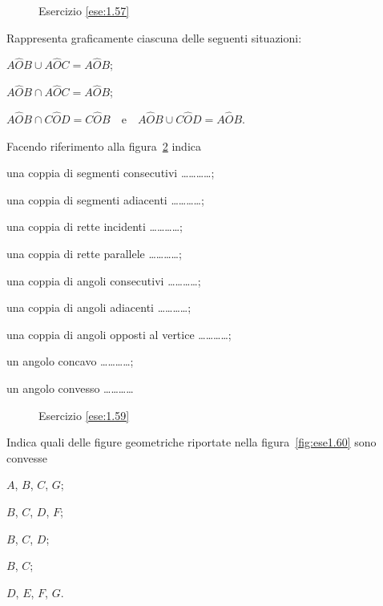 \begin{figure}[htb]
 \centering
 \caption{Esercizio \ref{ese:1.57}}\label{fig:ese1.57}
\end{figure}

\begin{esercizio}
\label{ese:1.58}
Rappresenta graficamente ciascuna delle seguenti situazioni:
\begin{enumeratea}
\item $A\widehat{O}B\cup A\widehat{O}C=A\widehat{O}B$;
\item $A\widehat{O}B\cap A\widehat{O}C=A\widehat{O}B$;
\item $A\widehat{O}B\cap C\widehat{O}D=C\widehat{O}B$~~e~~$A\widehat{O}B\cup C\widehat{O}D=A\widehat{O}B$.
\end{enumeratea}
\end{esercizio}

\begin{esercizio}
\label{ese:1.59}
Facendo riferimento alla figura~\ref{fig:ese1.59} indica
\begin{enumeratea}
\item una coppia di segmenti consecutivi \ldots\ldots\ldots\ldots{};
\item una coppia di segmenti adiacenti \ldots\ldots\ldots\ldots{};
\item una coppia di rette incidenti \ldots\ldots\ldots\ldots{};
\item una coppia di rette parallele \ldots\ldots\ldots\ldots{};
\item una coppia di angoli consecutivi \ldots\ldots\ldots\ldots{};
\item una coppia di angoli adiacenti \ldots\ldots\ldots\ldots{};
\item una coppia di angoli opposti al vertice \ldots\ldots\ldots\ldots{};
\item un angolo concavo \ldots\ldots\ldots\ldots{};
\item un angolo convesso \ldots\ldots\ldots\ldots{}
\end{enumeratea}
\end{esercizio}

\begin{figure}[htb]
 \centering
 \caption{Esercizio \ref{ese:1.59}}\label{fig:ese1.59}
\end{figure}

\begin{esercizio}
\label{ese:1.60}
Indica quali delle figure geometriche riportate nella figura~\ref{fig:ese1.60} sono convesse
\begin{multicols}{5}
\begin{enumeratea}
\item $A$, $B$, $C$, $G$;
\item $B$, $C$, $D$, $F$;
\item $B$, $C$, $D$;
\item $B$, $C$;
\item $D$, $E$, $F$, $G$.
\end{enumeratea}
\end{multicols}
\end{esercizio}

